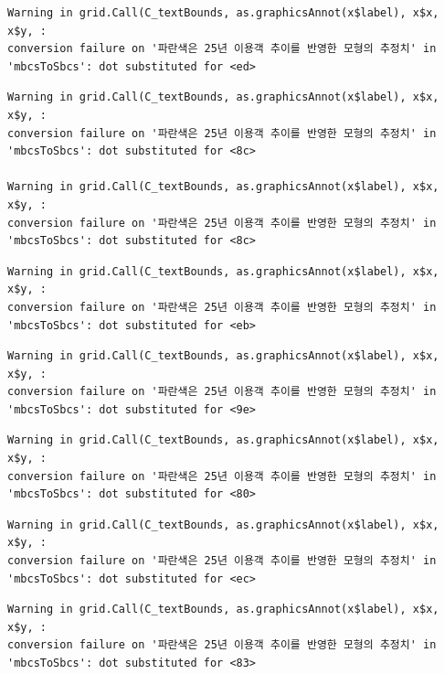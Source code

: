 \documentclass[
  letterpaper,
  DIV=11,
  numbers=noendperiod]{scrreprt}
\begin{document}
\begin{verbatim}
Warning in grid.Call(C_textBounds, as.graphicsAnnot(x$label), x$x, x$y, :
conversion failure on '파란색은 25년 이용객 추이를 반영한 모형의 추정치' in
'mbcsToSbcs': dot substituted for <ed>
\end{verbatim}

\begin{verbatim}
Warning in grid.Call(C_textBounds, as.graphicsAnnot(x$label), x$x, x$y, :
conversion failure on '파란색은 25년 이용객 추이를 반영한 모형의 추정치' in
'mbcsToSbcs': dot substituted for <8c>

Warning in grid.Call(C_textBounds, as.graphicsAnnot(x$label), x$x, x$y, :
conversion failure on '파란색은 25년 이용객 추이를 반영한 모형의 추정치' in
'mbcsToSbcs': dot substituted for <8c>
\end{verbatim}

\begin{verbatim}
Warning in grid.Call(C_textBounds, as.graphicsAnnot(x$label), x$x, x$y, :
conversion failure on '파란색은 25년 이용객 추이를 반영한 모형의 추정치' in
'mbcsToSbcs': dot substituted for <eb>
\end{verbatim}

\begin{verbatim}
Warning in grid.Call(C_textBounds, as.graphicsAnnot(x$label), x$x, x$y, :
conversion failure on '파란색은 25년 이용객 추이를 반영한 모형의 추정치' in
'mbcsToSbcs': dot substituted for <9e>
\end{verbatim}

\begin{verbatim}
Warning in grid.Call(C_textBounds, as.graphicsAnnot(x$label), x$x, x$y, :
conversion failure on '파란색은 25년 이용객 추이를 반영한 모형의 추정치' in
'mbcsToSbcs': dot substituted for <80>
\end{verbatim}

\begin{verbatim}
Warning in grid.Call(C_textBounds, as.graphicsAnnot(x$label), x$x, x$y, :
conversion failure on '파란색은 25년 이용객 추이를 반영한 모형의 추정치' in
'mbcsToSbcs': dot substituted for <ec>
\end{verbatim}

\begin{verbatim}
Warning in grid.Call(C_textBounds, as.graphicsAnnot(x$label), x$x, x$y, :
conversion failure on '파란색은 25년 이용객 추이를 반영한 모형의 추정치' in
'mbcsToSbcs': dot substituted for <83>
\end{verbatim}
\end{document}
